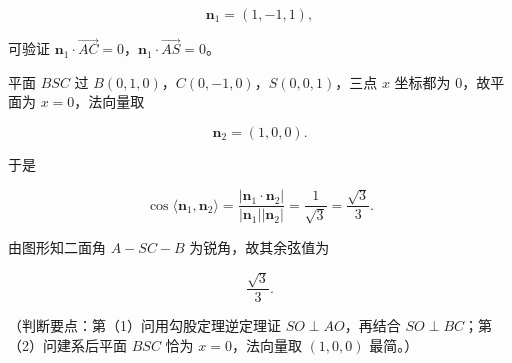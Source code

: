 \begin{answer}
\nopagebreak[4]
\[\boldsymbol n_1=(1,-1,1),\]

可验证 $\boldsymbol n_1\cdot\overrightarrow{AC}=0$，$\boldsymbol n_1\cdot\overrightarrow{AS}=0$。

平面 $BSC$ 过 $B(0,1,0)$，$C(0,-1,0)$，$S(0,0,1)$，三点 $x$ 坐标都为 $0$，故平面为 $x=0$，法向量取

\nopagebreak[4]
\[\boldsymbol n_2=(1,0,0).\]

于是

\nopagebreak[4]
\[\cos\langle\boldsymbol n_1,\boldsymbol n_2\rangle=\frac{|\boldsymbol n_1\cdot\boldsymbol n_2|}{|\boldsymbol n_1||\boldsymbol n_2|}=\frac{1}{\sqrt3}=\frac{\sqrt3}{3}.\]

由图形知二面角 $A-SC-B$ 为锐角，故其余弦值为

\nopagebreak[4]
\[\frac{\sqrt3}{3}.\]

（判断要点：第（1）问用勾股定理逆定理证 $SO\perp AO$，再结合 $SO\perp BC$；第（2）问建系后平面 $BSC$ 恰为 $x=0$，法向量取 $(1,0,0)$ 最简。）


\end{answer}
